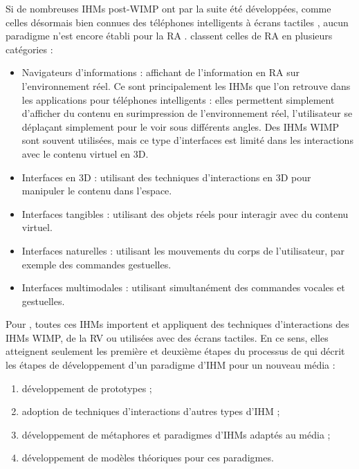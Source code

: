 Si de nombreuses IHMs post-WIMP ont par la suite été développées, comme celles désormais bien connues des téléphones intelligents à écrans tactiles \citep{Jacob2008}, aucun paradigme n'est encore établi pour la RA \citep{VanKrevelen2010}. \cite{Billinghurst2015} classent celles de RA en plusieurs catégories :
\begin{itemize}
  \item Navigateurs d'informations : affichant de l'information en RA sur l'environnement réel. Ce sont principalement les IHMs que l'on retrouve dans les applications pour téléphones intelligents  : elles permettent simplement d'afficher du contenu en surimpression de l'environnement réel, l'utilisateur se déplaçant simplement pour le voir sous différents angles. Des IHMs WIMP sont souvent utilisées, mais ce type d'interfaces est limité dans les interactions avec le contenu virtuel en 3D.
  \item Interfaces en 3D : utilisant des techniques d'interactions en 3D pour manipuler le contenu dans l'espace.
  \item Interfaces tangibles : utilisant des objets réels pour interagir avec du contenu virtuel.
  \item Interfaces naturelles : utilisant les mouvements du corps de l'utilisateur, par exemple des commandes gestuelles.
  \item Interfaces multimodales : utilisant simultanément des commandes vocales et gestuelles.
\end{itemize}
\medskip

Pour \cite{Billinghurst2015}, toutes ces IHMs importent et appliquent des techniques d'interactions des IHMs WIMP, de la RV ou utilisées avec des écrans tactiles. En ce sens, elles atteignent seulement les première et deuxième étapes du processus de \cite{Billinghurst2005} qui décrit les étapes de développement d'un paradigme d'IHM pour un nouveau média :
\begin{enumerate}
  \item développement de prototypes ;
  \item adoption de techniques d'interactions d'autres types d'IHM ;
  \item développement de métaphores et paradigmes d'IHMs adaptés au média ;
  \item développement de modèles théoriques pour ces paradigmes.
\end{enumerate}
\medskip

